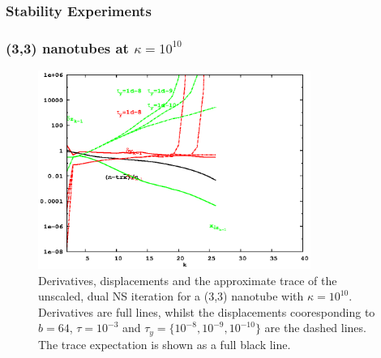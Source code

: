 \documentclass[letterpaper,twocolumn,amsmath,amsfont,amssymb,english,aps,jcp,preprintnumbers,groupaddress,nofootinbib,tightenlines]{revtex4}
\begin{document}
\subsubsection{Stability Experiments}

\subsubsection{(3,3) nanotubes at $\kappa=10^{10}$}


\begin{figure}[h]
\includegraphics[width=3.5in]{fig_33_tube_cond_10_noscaling/33_nanotube_cond10_noscale_dual.eps}
\caption{Derivatives, displacements and the approximate trace of the unscaled, dual NS iteration for a (3,3) nanotube with $\kappa =10^{10}$. 
Derivatives are full lines, whilst the displacements cooresponding to $b=64$, $\tau=10^{-3}$ and $\tau_y=\{10^{-8}, 10^{-9}, 10^{-10}\}$  
are the dashed lines.  The trace expectation is shown as a full black line. }
\end{figure}


\end{document}
